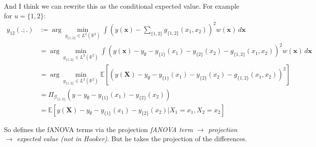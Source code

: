 And I think we can rewrite this as the conditional expected value. For example for $u = \{1,2\}$:
\begin{align*}
    y_{12}(.;.) &:= \arg \min_{g_{\{1,2\}} \in L^2(\mathbb{R}^2)} \int \left( y(\boldsymbol{x}) - \sum_{\{1,2\}} g_{\{1,2\}}(x_1, x_2) \right)^2 w(\boldsymbol{x}) \, d\boldsymbol{x} \\
    &= \arg \min_{g_{\{1,2\}} \in L^2(\mathbb{R}^2)} \int \left( y(\boldsymbol{x}) - y_\emptyset - y_{\{1\}}(x_1) - y_{\{2\}}(x_2) - g_{\{1,2\}}(x_1, x_2) \right)^2 w(\boldsymbol{x}) \, d\boldsymbol{x} \\
    &= \arg \min_{g_{\{1,2\}} \in L^2(\mathbb{R}^2)} \mathbb{E}[(y(\boldsymbol{X}) - y_\emptyset - y_{\{1\}}(x_1) - y_{\{2\}}(x_2) - g_{\{1,2\}}(x_1, x_2))^2] \\
    &= \Pi_{\mathcal{G}_{\{1,2\}}}(y - y_\emptyset - y_{\{1\}}(x_1) - y_{\{2\}}(x_2)) \\
    &= \mathbb{E}[y(\boldsymbol{X}) - y_{\emptyset} - y_{\{1\}}(x_1) - y_{\{2\}}(x_2) | X_1 = x_1, X_2 = x_2]
\end{align*}

So \cite{hooker2007} defines the fANOVA terms via the projection \textit{fANOVA term $\rightarrow$ projection $\rightarrow$ expected value (not in Hooker)}. But he takes the projection of the differences. 

